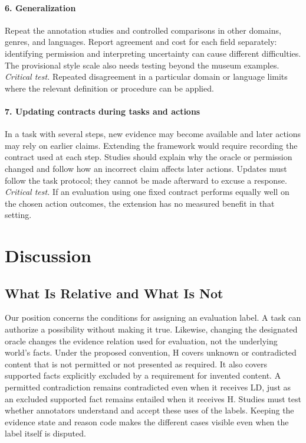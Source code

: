 \documentclass{clv2025}
\begin{document}
\paragraph{6. Generalization}
Repeat the annotation studies and controlled comparisons in other domains,
genres, and languages. Report agreement and cost for each field separately:
identifying permission and interpreting uncertainty can cause different
difficulties. The provisional style scale also needs testing beyond the
museum examples.
\emph{Critical test.} Repeated disagreement in a particular domain or
language limits where the relevant definition or procedure can be applied.

\paragraph{7. Updating contracts during tasks and actions}
In a task with several steps, new evidence may become available and later
actions may rely on earlier claims. Extending the framework would require
recording the contract used at each step. Studies should explain why the
oracle or permission changed and follow how an incorrect claim affects later
actions. Updates must follow the task protocol; they cannot be made afterward
to excuse a response.
\emph{Critical test.} If an evaluation using one fixed contract performs
equally well on the chosen action outcomes, the extension has no measured
benefit in that setting.

\section{Discussion}\label{sec:discussion}

\subsection{What Is Relative and What Is Not}\label{subsec:relative}

Our position concerns the conditions for assigning an evaluation label.
A task can authorize a possibility without making it true. Likewise,
changing the designated oracle changes the evidence relation used for
evaluation, not the underlying world's facts. Under the proposed convention,
H covers unknown or contradicted content that is not permitted or not presented
as required. It also covers supported facts explicitly excluded by a requirement
for invented content. A permitted contradiction remains contradicted even when
it receives LD, just as an excluded supported fact remains entailed when it
receives H. Studies must test whether annotators understand and accept these
uses of the labels. Keeping the evidence state and reason code makes the
different cases visible even when the label itself is disputed.
\end{document}
